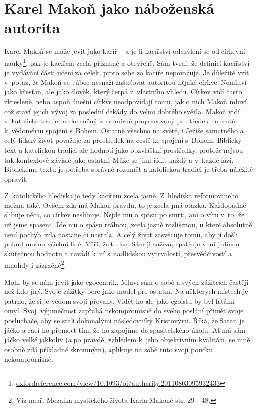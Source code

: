 \section{Karel Makoň jako náboženská autorita}

Karel Makoň se může jevit jako kacíř -- a je-li kacířství odchýlení se od
církevní
nauky\footnote{\href{https://www.oxfordreference.com/view/10.1093/oi/authority.20110803095932433}{oxfordreference.com/view/10.1093/oi/authority.20110803095932433}},
pak je kacířem zcela přiznaně a otevřeně. Sám tvrdí, že definicí
kacířství je vydávání části učení za celek, proto sebe za kacíře nepovažuje. Je
důležité vzít v~potaz, že Makoň se vůbec nesnaží zaštiťovat autoritou nějaké
církve. Nemluví jako křesťan, ale jako člověk, který čerpá z~vlastního vhledu.
Církev vidí často zkresleně, nebo aspoň dnešní církve neodpovídají tomu, jak o
nich Makoň mluví, což staví jejich vývoj za poslední dekády do velmi dobrého
světla. Makoň vidí v~katolické tradici nedoceněný a nesmírně propracovaný
prostředek na cestě k~vědomému spojení s~Bohem. Ostatně všechno na světě, i
Ježíše samotného a celý lidský život považuje za prostředek na cestě ke spojení
s~Bohem. Biblický text a katolickou tradici ale hodnotí jako obzvláštní
prostředky, protože nejsou tak kontextově závislé jako ostatní. Může se jimi
řídit každý a v~každé fázi. Biblickému textu je potřeba správně rozumět a
katolickou tradici je třeba náležitě opravit.

Z~katolického hlediska je tedy kacířem zcela jasně. Z~hlediska reformovaného
možná také. Ovšem zda má Makoň pravdu, to je zcela jiná otázka. Každopádně
slibuje něco, co církev neslibuje. Nejde mu o spásu po smrti, ani o víru v~to,
že už jsme spaseni. Jde mu o spásu reálnou, zcela jasně rozlišenou, u které
absolutně není pochyb, zda nastane či nastala. A celý život zasvěcuje tomu, aby
jí došli pokud možno všichni lidé. Věří, že to lze. Sám ji zažívá, spatřuje v~ní
jedinou skutečnou hodnotu a navádí k~ní s~nadlidskou vytrvalostí, přesvědčivostí
a mnohdy i zázračně\footnote{Viz např. Mozaika mystického života Karla Makoně
str. 29 - 48.}.

Mohl by se nám jevit jako egocentrik. Mluví sám o sobě a svých zážitcích častěji
než kdo jiný. Svoje zážitky bere jako model pro ostatní. Na některých místech je
patrno, že si je vědom svojí převahy. Vidět ho ale jako egoistu by byl
fatální omyl. Svoji výjimečnost zapřahá nekompromisně do svého poslání přimět
svoje posluchače, aby se stali dokonalými následovníky Kristovými. Říká, že
Satan je jáčko a radí ho přemoct tím, že ho zapojíme do spasitelského úkolu. Ať
má sám jáčko velké jakkoliv (a po pravdě, vzhledem k~jeho objektivním kvalitám,
se mně osobně zdá příkladně skromným), aplikuje na sobě tuto svoji poučku
nekompromisně.

